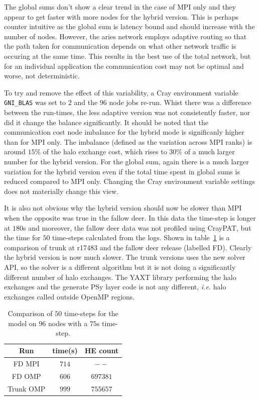The global sums don't show a clear trend in the case of MPI only and
they appear to get faster with more nodes for the hybrid version. This
is perhaps counter intuitive as the global sum is latency bound and
should increase with the number of nodes. However, the aries network
employs adaptive routing so that the path taken for communication
depends on what other network traffic is occuring at the same
time. This results in the best use of the total network, but for an
individual application the communication cost may not be optimal and
worse, not deterministic.

To try and remove the effect of this variability, a Cray environment
variable \verb+GNI_BLAS+ was set to $2$ and the $96$ node jobs re-run.
Whist there was a difference between the run-times, the less adaptive
version was not consistently faster, nor did it change the balance
significantly. It should be noted that the communication cost
node imbalance for the hybrid mode is significanly higher than for MPI
only. The imbalance (defined as the variation across MPI ranks) is
around $15\%$ of the halo exchange cost, which rises to $30\%$ of a
much larger number for the hybrid version. For the global sum, again
there is a much larger variation for the hybrid version even if the total time spent in
global sums is reduced compared to MPI only. Changing the Cray
environment variable settings does not materially change this view. 

It is also not obvious why the hybrid version should now be slower
than MPI when the opposite was true in the fallow deer. In this data
the time-step is longer at $180$s and moreover, the fallow deer data
was not profiled using CrayPAT, but the time for $50$ time-steps
calculated from the logs. Shown in table~\ref{fig:fd_comp} is a
comparison of trunk at r17483 and the fallow deer release (labelled
FD). Clearly the hybrid version is now much slower. The trunk versions
uses the new solver API, so the solver is a different algorithm but it
is not doing a significantly different number of halo exchanges. The
YAXT library performing the halo exchanges and the generate PSy layer
code is not any different, {\em i.e.} halo exchanges called outside OpenMP regions.

\begin{table}
\centering
\caption{\label{fig:fd_comp}Comparison of $50$ time-steps for the model on $96$ nodes
  with a $75$s time-step.}
\begin{tabular}{ccc}
Run & time(s) & HE count \\\hline
FD MPI & $714$ & $--$ \\
FD OMP & $606$ & $697381$ \\
Trunk OMP & $999$ & $755657$  
\end{tabular}
\end{table}

